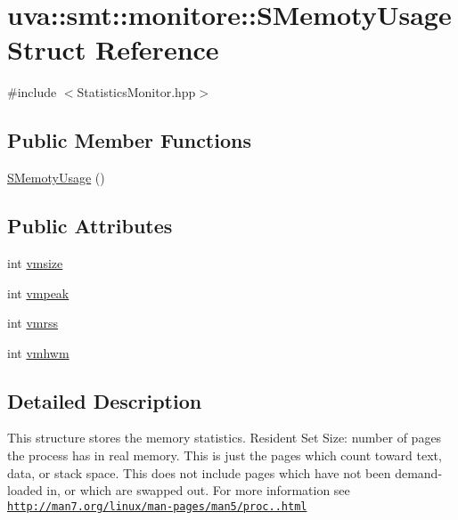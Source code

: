 \hypertarget{structuva_1_1smt_1_1monitore_1_1_s_memoty_usage}{}\section{uva\+:\+:smt\+:\+:monitore\+:\+:S\+Memoty\+Usage Struct Reference}
\label{structuva_1_1smt_1_1monitore_1_1_s_memoty_usage}


{\ttfamily \#include $<$Statistics\+Monitor.\+hpp$>$}

\subsection*{Public Member Functions}
\begin{DoxyCompactItemize}
\item 
\hyperlink{structuva_1_1smt_1_1monitore_1_1_s_memoty_usage_adf1c1843aedf97019b862dee0270b4cd}{S\+Memoty\+Usage} ()
\end{DoxyCompactItemize}
\subsection*{Public Attributes}
\begin{DoxyCompactItemize}
\item 
int \hyperlink{structuva_1_1smt_1_1monitore_1_1_s_memoty_usage_a4f9b4e9f1c158f9d2889689769579412}{vmsize}
\item 
int \hyperlink{structuva_1_1smt_1_1monitore_1_1_s_memoty_usage_ae22d05a79f8266bc69c7306afe125422}{vmpeak}
\item 
int \hyperlink{structuva_1_1smt_1_1monitore_1_1_s_memoty_usage_af2b92553ae06f9b632942a23c20b9fee}{vmrss}
\item 
int \hyperlink{structuva_1_1smt_1_1monitore_1_1_s_memoty_usage_a3f6608a284e9feadc00c0d38309e9a8a}{vmhwm}
\end{DoxyCompactItemize}


\subsection{Detailed Description}
This structure stores the memory statistics. Resident Set Size\+: number of pages the process has in real memory. This is just the pages which count toward text, data, or stack space. This does not include pages which have not been demand-\/loaded in, or which are swapped out. For more information see \href{http://man7.org/linux/man-pages/man5/proc.5.html}{\tt http\+://man7.\+org/linux/man-\/pages/man5/proc..\+html} 

